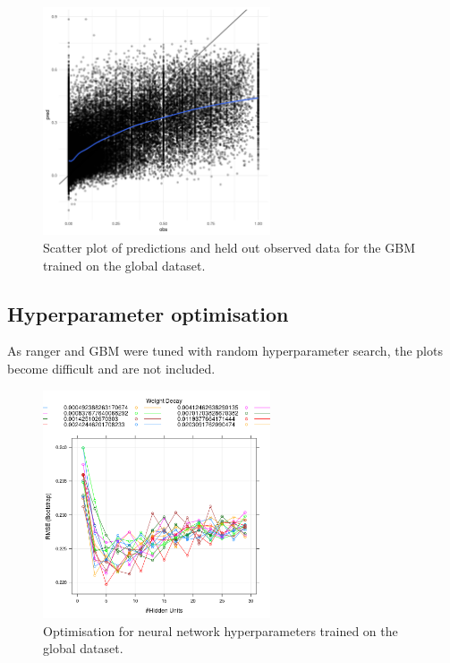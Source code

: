 \documentclass[review]{elsarticle}
\begin{document}
\begin{figure}[h!]
  \centering
  \includegraphics[width=0.6\textwidth]{figs/SI/gbm_obspred_global.png}
\caption{
  Scatter plot of predictions and held out observed data for the GBM trained on the global dataset.
}

\end{figure}


\clearpage
\subsection{Hyperparameter optimisation}

As ranger and GBM were tuned with random hyperparameter search, the plots become difficult and are not included.

\begin{figure}[h!]
  \centering
  \includegraphics[width=0.6\textwidth]{figs/SI/nnetopt_global.png}
\caption{
  Optimisation for neural network hyperparameters trained on the global dataset.
}

\end{figure}
\end{document}
